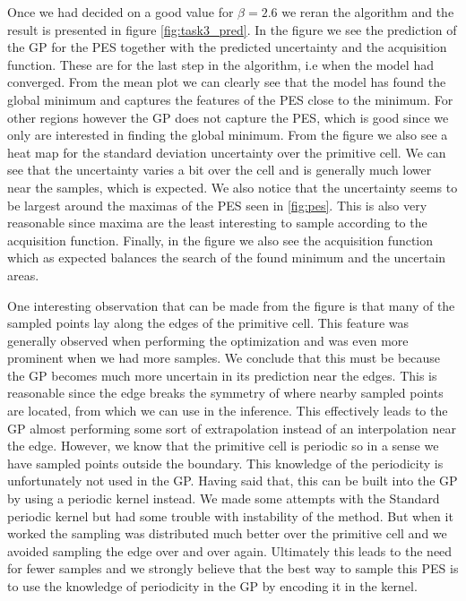 \documentclass[11pt,a4paper]{article}
\begin{document}
Once we had decided on a good value for $\beta = 2.6$ we reran the algorithm and the result is presented in figure \ref{fig:task3_pred}. In the figure we see the prediction of the GP for the PES together with the predicted uncertainty and the acquisition function. These are for the last step in the algorithm, i.e when the model had converged. From the mean plot we can clearly see that the model has found the global minimum and captures the features of the PES close to the minimum. For other regions however the GP does not capture the PES, which is good since we only are interested in finding the global minimum. From the figure we also see a heat map for the standard deviation uncertainty over the primitive cell. We can see that the uncertainty varies a bit over the cell and is generally much lower near the samples, which is expected. We also notice that the uncertainty seems to be largest around the maximas of the PES seen in \ref{fig:pes}. This is also very reasonable since maxima are the least interesting to sample according to the acquisition function. Finally, in the figure we also see the acquisition function which as expected balances the search of the found minimum and the uncertain areas.


One interesting observation that can be made from the figure is that many of the sampled points lay along the edges of the primitive cell. This feature was generally observed when performing the optimization and was even more prominent when we had more samples. We conclude that this must be because the GP becomes much more uncertain in its prediction near the edges. This is reasonable since the edge breaks the symmetry of where nearby sampled points are located, from which we can use in the inference. This effectively leads to the GP almost performing some sort of extrapolation instead of an interpolation near the edge. However, we know that the primitive cell is periodic so in a sense we have sampled points outside the boundary. This knowledge of the periodicity is unfortunately not used in the GP. Having said that, this can be built into the GP by using a periodic kernel instead. We made some attempts with the Standard periodic kernel but had some trouble with instability of the method. But when it worked the sampling was distributed much better over the primitive cell and we avoided sampling the edge over and over again. Ultimately this leads to the need for fewer samples and we strongly believe that the best way to sample this PES is to use the knowledge of periodicity in the GP by encoding it in the kernel. 
\end{document}
